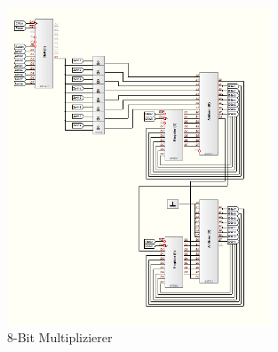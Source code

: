 \documentclass[a4paper,12pt,fleqn,oneside]{article}
\begin{document}
		\begin{figure}[h]
			\center
			\includegraphics[width=0.7\textwidth]{multiplizierer}
			\caption{8-Bit Multiplizierer}
			\label{fig:Multiplizierer}
		\end{figure}
\end{document}
